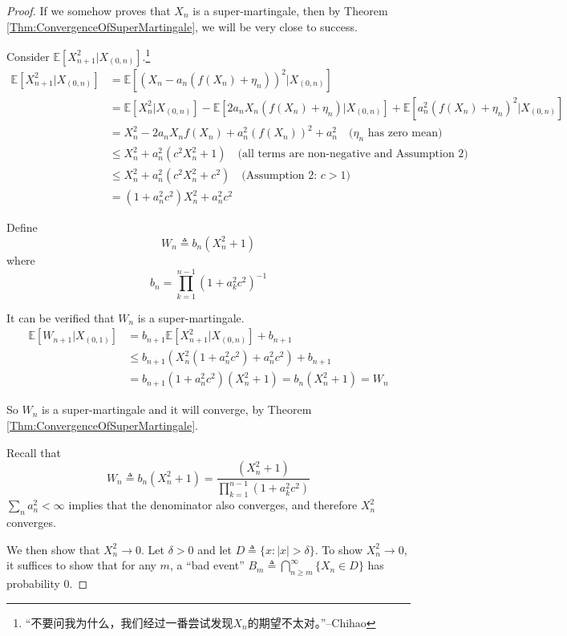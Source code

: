     \begin{proof}
        If we somehow proves that $X_n$ is a super-martingale, then by Theorem \ref{Thm:ConvergenceOfSuperMartingale}, we will be very close to success.

        Consider $\mathbb{E}[X_{n+1}^2 | X_{(0,n)}]$.\footnote{“不要问我为什么，我们经过一番尝试发现$X_n$的期望不太对。”--Chihao}
        \begin{align*}
            \mathbb{E}[X_{n+1}^2|X_{(0,n)}] &= \mathbb{E}[(X_n - a_n(f(X_n) + \eta_n))^2 | X_{(0,n)}]\\
            &= \mathbb{E}[X_n^2|X_{(0,n)}] - \mathbb{E}[2a_nX_n(f(X_n)+\eta_n)|X_{(0,n)}] + \mathbb{E}[a_n^2(f(X_n) + \eta_n)^2|X_{(0,n)}]\\
            &= X_n^2 - 2a_nX_nf(X_n) + a_n^2(f(X_n))^2 + a_n^2 \quad \text{($\eta_n$ has zero mean)}\\
            &\le X_n^2 + a_n^2\left(c^2 X_n^2 + 1\right) \quad \text{(all terms are non-negative and Assumption 2)}\\
            &\le X_n^2 + a_n^2\left(c^2 X_n^2 + c^2\right) \quad \text{(Assumption 2: $c > 1$)}\\
            &= \left( 1 + a_n^2c^2 \right)X_n^2 + a_n^2c^2
        \end{align*}
        
        Define
        \[ W_n \triangleq b_n(X_n^2 + 1) \]
        where
        \[ b_n = \prod_{k=1}^{n-1}(1 + a_k^2 c^2)^{-1} \]

        It can be verified that $W_n$ is a super-martingale.
        \begin{align*}
            \mathbb{E}[W_{n+1}|X_{(0,1)}] &= b_{n+1}\mathbb{E}[X_{n+1}^2|X_{(0,n)}] + b_{n+1}\\
            &\le b_{n+1}\left( X_n^2 \left( 1+a_n^2c^2 \right) + a_n^2c^2 \right) + b_{n+1}\\
            &= b_{n+1}(1+a_n^2c^2)(X_n^2+1) = b_n(X_n^2+1) = W_n
        \end{align*}

        So $W_n$ is a super-martingale and it will converge, by Theorem \ref{Thm:ConvergenceOfSuperMartingale}.

        Recall that
        \[ W_n \triangleq b_n(X_n^2 + 1) = \frac{(X_n^2 + 1)}{\prod_{k=1}^{n-1}(1 + a_k^2 c^2)} \]
        $\sum_n a_n^2 < \infty$ implies that the denominator also converges, and therefore $X_n^2$ converges.

        We then show that $X_n^2 \to 0$. Let $\delta > 0$ and let $D \triangleq \{x:|x| > \delta\}$. To show $X_n^2 \to 0$, it suffices to show that for any $m$, a ``bad event'' $B_m \triangleq \bigcap_{n \ge m}^{\infty} \{X_n \in D\}$ has probability 0.


\end{proof}
